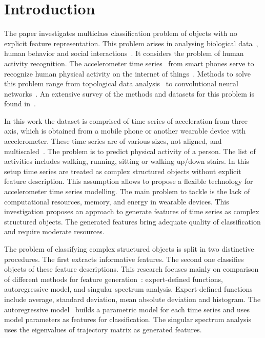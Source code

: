 \documentclass{llncs}
\begin{document}
\section{Introduction}
The paper investigates multiclass classification problem of objects with no explicit feature representation. This problem arises in analysing biological data~\cite{motrenko2016extracting}, human behavior and social interactions~\cite{bao2004activity}. It considers the problem of human activity recognition.
The accelerometer time series~\cite{ignatov2016human,lu2016towards,wang2014human} from smart phones serve to recognize human physical activity on the internet of things~\cite{budnik2017learned,lu2016activity}.
Methods to solve this problem range from topological data analysis~\cite{umeda2017time} to convolutional neural networks~\cite{hammerla2016deep}. 
An extensive survey of the methods and datasets for this problem is found in~\cite{incel2013review}. 

In this work the dataset is comprised of time series of acceleration from three axis, which is obtained from a mobile phone or another wearable device with accelerometer. 
These time series are of various sizes, not aligned, and multiscaled~\cite{geurts2001pattern}.
The problem is to predict physical activity of a person. 
The list of activities includes walking, running, sitting or walking up/down stairs.
In this setup time series are treated as complex structured objects without explicit feature description. 
This assumption allows to propose a flexible technology for accelerometer time series modelling. 
The main problem to tackle is the lack of computational resources, memory, and energy in wearable devices. 
This investigation proposes an approach to generate features of time series as complex structured objects. 
The generated features bring adequate quality of classification and require moderate resources.

The problem of classifying complex structured objects is split in two distinctive procedures. 
The first extracts informative features. The second one classifies objects of these feature descriptions.
This research focuses mainly on comparison of different methods for feature generation~\cite{karasikov2016feature,ivkin2015ts}: expert-defined functions, autoregressive model, and singular spectrum analysis.
Expert-defined functions~\cite{kwapisz2011activity} include average, standard deviation, mean absolute deviation and histogram. The autoregressive model~\cite{lukashin2003adaptive} builds a parametric model for each time series and uses model parameters as features for classification. The singular spectrum analysis~\cite{hassani2007singular} uses the eigenvalues of trajectory matrix as generated features.
\end{document}
